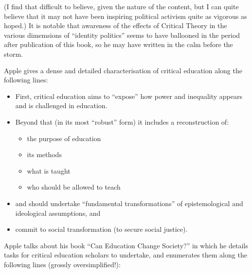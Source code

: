 \documentclass[10pt,titlepage]{book}
\begin{document}
(I find that difficult to believe, given the nature of the content, but I can quite believe that it may not have been inspiring political activism quite as vigorous as hoped.)
It is notable that awareness of the effects of Critical Theory in the various dimemsions of ``identity politics'' seems to have ballooned in the period after publication of this book, so he may have written in the calm before the storm.

Apple gives a dense and detailed characterisation of critical education along the following lines:

\begin{itemize}
\item First, critical education aims to ``expose'' how power and inequality appears and is challenged in education.
\item Beyond that (in its most ``robust'' form) it includes a reconstruction of:
  \begin{itemize}
  \item the purpose of education
  \item its methods
  \item what is taught
  \item who should be allowed to teach
  \end{itemize}
\item and should undertake ``fundamental transformations'' of epistemological and ideological assumptions, and
  \item commit to social transformation (to secure social justice).
\end{itemize}

Apple talks about his book ``Can Education Change Society?'' in which he details tasks for critical education scholars to undertake, and enumerates them along the following lines (grossly oversimplified!):
\end{document}
